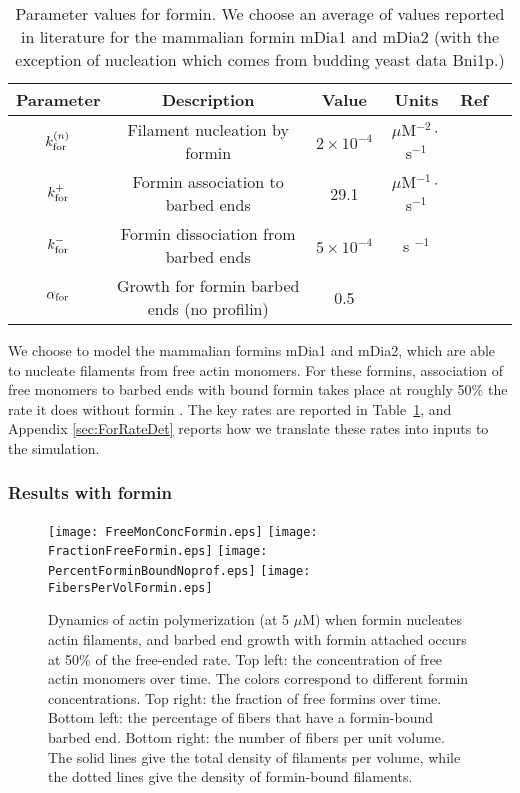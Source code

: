 \documentclass[11pt]{article}
\begin{document}
\begin{table}
\begin{center}
\begin{tabular}{|c|c|c|c|c|c|}\hline
Parameter & Description & Value & Units & Ref  \\ \hline
$k_\text{for}^{(n)}$ & Filament nucleation by formin & $2 \times 10^{-4}$ & $\mu$M$^{-2}\cdot$s$^{-1}$& \cite[Tab.~S1]{paul2008role}  \\ 
$k_\text{for}^+$ & Formin association to barbed ends& 29.1 & $\mu$M$^{-1} \cdot $s$^{-1}$ & \cite{shekhar2015formin} \\
$k_\text{for}^-$ & Formin dissociation from barbed ends& $5 \times 10^{-4}$ & s $^{-1}$ & \cite{kovar2006control}\\
$\alpha_\text{for}$ &Growth for formin barbed ends (no profilin) & 0.5 & & \cite{kovar2006control}\\ \hline
\end{tabular}
\caption{\label{tab:paramsF} Parameter values for formin. We choose an average of values reported in literature for the mammalian formin mDia1 and mDia2 (with the exception of nucleation which comes from budding yeast data Bni1p.)}
\end{center}
\end{table}

We choose to model the mammalian formins mDia1 and mDia2, which are able to nucleate filaments from free actin monomers. For these formins, association of free monomers to barbed ends with bound formin takes place at roughly 50\% the rate it does without formin \cite{kovar2006control}. The key rates are reported in Table\ \ref{tab:paramsF}, and Appendix \ref{sec:ForRateDet} reports how we translate these rates into inputs to the simulation. 

\subsubsection{Results with formin}
\begin{figure}
\centering
\texttt{[image: FreeMonConcFormin.eps]}
\texttt{[image: FractionFreeFormin.eps]}
\texttt{[image: PercentForminBoundNoprof.eps]}
\texttt{[image: FibersPerVolFormin.eps]}
\caption{\label{fig:ActinNucWithFormin}Dynamics of actin polymerization (at 5 $\mu$M) when formin nucleates actin filaments, and barbed end growth with formin attached occurs at 50\% of the free-ended rate. Top left: the concentration of free actin monomers over time. The colors correspond to different formin concentrations. Top right: the fraction of free formins over time. Bottom left: the percentage of fibers that have a formin-bound barbed end. Bottom right: the number of fibers per unit volume. The solid lines give the total density of filaments per volume, while the dotted lines give the density of formin-bound filaments.}
\end{figure}
\end{document}
